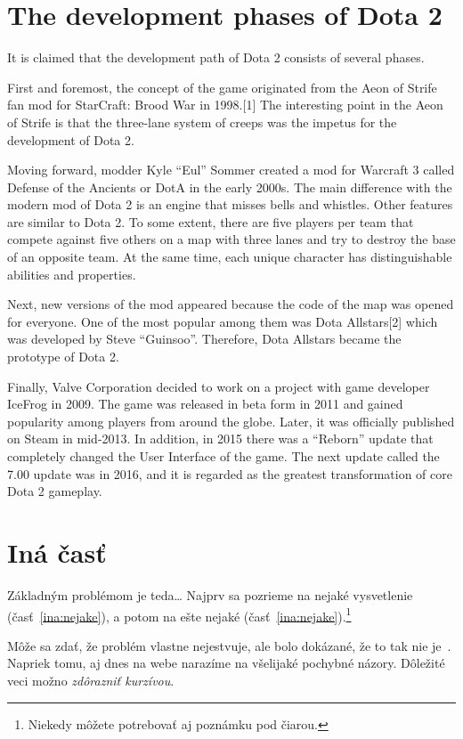 \documentclass[10pt,twoside,slovak,a4paper]{article}
\begin{document}
\section{The development phases of Dota 2} \label{The development phases of Dota 2}
It is claimed that the development path of Dota 2 consists of several phases.

First and foremost, the concept of the game originated from the Aeon of Strife fan mod for StarCraft: Brood War in 1998.[1] The interesting point in the Aeon of Strife is that the three-lane system of creeps was the impetus for the development of Dota 2. 

Moving forward, modder Kyle “Eul” Sommer created a mod for Warcraft 3 called Defense of the Ancients or DotA in the early 2000s. The main difference with the modern mod of Dota 2 is an engine that misses bells and whistles. Other features are similar to Dota 2. To some extent, there are five players per team that compete against five others on a map with three lanes and try to destroy the base of an opposite team. At the same time, each unique character has distinguishable abilities and properties. 

Next, new versions of the mod appeared because the code of the map was opened for everyone. One of the most popular among them was Dota Allstars[2] which was developed by Steve “Guinsoo”. Therefore, Dota Allstars became the prototype of Dota 2.

Finally, Valve Corporation decided to work on a project with game developer IceFrog in 2009. The game was released in beta form in 2011 and gained popularity among players from around the globe. Later, it was officially published on Steam in mid-2013. In addition, in 2015 there was a “Reborn” update that completely changed the User Interface of the game. The next update called the 7.00 update was in 2016, and it is regarded as the greatest transformation of core Dota 2 gameplay.




\section{Iná časť} \label{ina}

Základným problémom je teda\ldots{} Najprv sa pozrieme na nejaké vysvetlenie (časť~\ref{ina:nejake}), a potom na ešte nejaké (časť~\ref{ina:nejake}).\footnote{Niekedy môžete potrebovať aj poznámku pod čiarou.}

Môže sa zdať, že problém vlastne nejestvuje\cite{Coplien:MPD}, ale bolo dokázané, že to tak nie je~\cite{Czarnecki:Staged, Czarnecki:Progress}. Napriek tomu, aj dnes na webe narazíme na všelijaké pochybné názory\cite{PLP-Framework}. Dôležité veci možno \emph{zdôrazniť kurzívou}.
\end{document}
